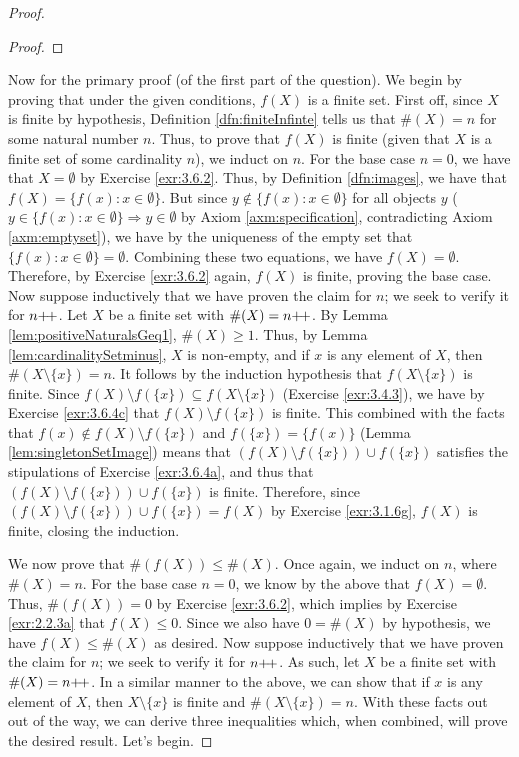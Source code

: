 \documentclass[../main.tex]{subfiles}
\begin{document}
\begin{enumerate}[ref={\thesection.\arabic*}]
\begin{prp}
\begin{enumerate}[label={\textup{(}\alph*\textup{)}},ref={\theenumi\alph*}]
\begin{proof}
\begin{lem}
\begin{proof}
                    \end{proof}
                \end{lem}
                Now for the primary proof (of the first part of the question). We begin by proving that under the given conditions, $f(X)$ is a finite set. First off, since $X$ is finite by hypothesis, Definition \ref{dfn:finiteInfinte} tells us that $\#(X)=n$ for some natural number $n$. Thus, to prove that $f(X)$ is finite (given that $X$ is a finite set of some cardinality $n$), we induct on $n$. For the base case $n=0$, we have that $X=\emptyset$ by Exercise \ref{exr:3.6.2}. Thus, by Definition \ref{dfn:images}, we have that $f(X)=\{f(x):x\in\emptyset\}$. But since $y\notin\{f(x):x\in\emptyset\}$ for all objects $y$ ($y\in\{f(x):x\in\emptyset\} \Longrightarrow y\in\emptyset$ by Axiom \ref{axm:specification}, contradicting Axiom \ref{axm:emptyset}), we have by the uniqueness of the empty set that $\{f(x):x\in\emptyset\}=\emptyset$. Combining these two equations, we have $f(X)=\emptyset$. Therefore, by Exercise \ref{exr:3.6.2} again, $f(X)$ is finite, proving the base case. Now suppose inductively that we have proven the claim for $n$; we seek to verify it for $n{+\!+}$. Let $X$ be a finite set with $\#(X)=n{+\!+}$. By Lemma \ref{lem:positiveNaturalsGeq1}, $\#(X)\geq 1$. Thus, by Lemma \ref{lem:cardinalitySetminus}, $X$ is non-empty, and if $x$ is any element of $X$, then $\#(X\setminus\{x\})=n$. It follows by the induction hypothesis that $f(X\setminus\{x\})$ is finite. Since $f(X)\setminus f(\{x\})\subseteq f(X\setminus\{x\})$ (Exercise \ref{exr:3.4.3}), we have by Exercise \ref{exr:3.6.4c} that $f(X)\setminus f(\{x\})$ is finite. This combined with the facts that $f(x)\notin f(X)\setminus f(\{x\})$ and $f(\{x\})=\{f(x)\}$ (Lemma \ref{lem:singletonSetImage}) means that $(f(X)\setminus f(\{x\}))\cup f(\{x\})$ satisfies the stipulations of Exercise \ref{exr:3.6.4a}, and thus that $(f(X)\setminus f(\{x\}))\cup f(\{x\})$ is finite. Therefore, since $(f(X)\setminus f(\{x\}))\cup f(\{x\})=f(X)$ by Exercise \ref{exr:3.1.6g}, $f(X)$ is finite, closing the induction.\par
                We now prove that $\#(f(X))\leq\#(X)$. Once again, we induct on $n$, where $\#(X)=n$. For the base case $n=0$, we know by the above that $f(X)=\emptyset$. Thus, $\#(f(X))=0$ by Exercise \ref{exr:3.6.2}, which implies by Exercise \ref{exr:2.2.3a} that $f(X)\leq 0$. Since we also have $0=\#(X)$ by hypothesis, we have $f(X)\leq\#(X)$ as desired. Now suppose inductively that we have proven the claim for $n$; we seek to verify it for $n{+\!+}$. As such, let $X$ be a finite set with $\#(X)=n{+\!+}$. In a similar manner to the above, we can show that if $x$ is any element of $X$, then $X\setminus\{x\}$ is finite and $\#(X\setminus\{x\})=n$. With these facts out out of the way, we can derive three inequalities which, when combined, will prove the desired result. Let's begin.

\end{proof}
\end{enumerate}
\end{prp}
\end{enumerate}
\end{document}

